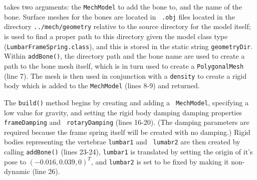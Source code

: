 takes two arguments: the {\tt MechModel} to add the bone to, and the
name of the bone. Surface meshes for the bones are located in {\tt
.obj} files located in the directory {\tt ../mech/geometry} relative
to the source directory for the model itself;
is used to find a proper path to this directory given the model class
type ({\tt LumbarFrameSpring.class}), and this is stored in the static
string {\tt geometryDir}. Within {\tt addBone()}, the directory path
and the bone name are used to create a path to the bone mesh itself,
which is in turn used to create a {\tt PolygonalMesh} (line 7). The
mesh is then used in conjunction with a {\tt density} to create a
rigid body which is added to the {\tt MechModel} (lines 8-9) and
returned.

The {\tt build()} method begins by creating and adding a {\tt
MechModel}, specifying a low value for gravity, and setting the rigid
body damping damping properties {\tt frameDamping} and {\tt
rotaryDamping} (lines 16-20). (The damping parameters are required
because the frame spring itself will be created with no damping.)
Rigid bodies representing the vertebrae {\tt lumbar1} and {\tt
lumabr2} are then created by calling {\tt addBone()} (lines 23-24),
{\tt lumbar1} is translated by setting the origin of it's pose to
$(-0.016, 0.039, 0)^T$, and {\tt lumbar2} is set to be fixed by making
it non-dynamic (line 26).

